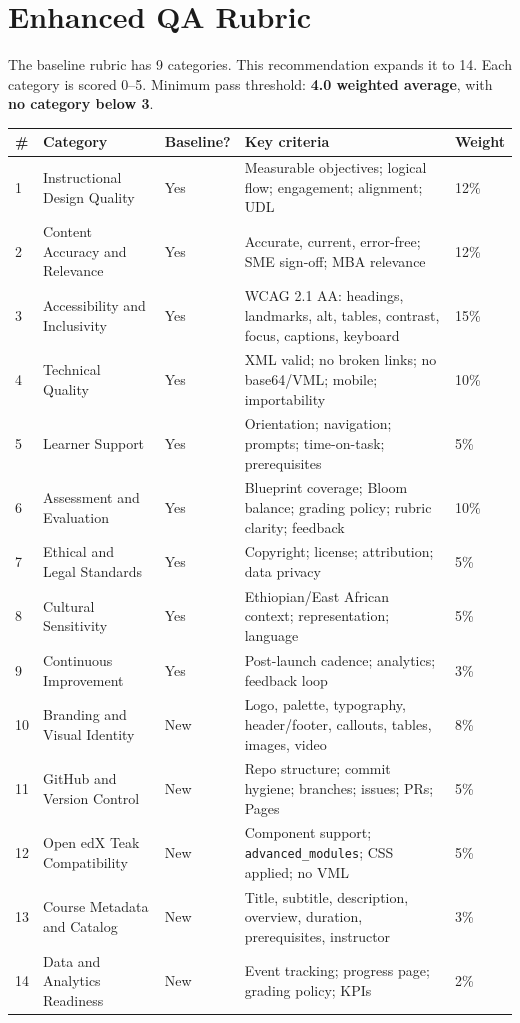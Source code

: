 \chapter{Enhanced QA Rubric}

The baseline rubric has 9 categories. This recommendation expands it
to 14. Each category is scored 0--5. Minimum pass threshold:
\textbf{4.0 weighted average}, with \textbf{no category below 3}.

\begin{longtable}{@{}p{}p{}p{}p{}p{}@{}}
\toprule
\textbf{\#} & \textbf{Category} & \textbf{Baseline?} & \textbf{Key criteria} & \textbf{Weight} \\
\midrule
\endhead
1 & Instructional Design Quality & Yes & Measurable objectives; logical flow; engagement; alignment; UDL & 12\% \\
2 & Content Accuracy and Relevance & Yes & Accurate, current, error-free; SME sign-off; MBA relevance & 12\% \\
3 & Accessibility and Inclusivity & Yes & WCAG 2.1 AA: headings, landmarks, alt, tables, contrast, focus, captions, keyboard & 15\% \\
4 & Technical Quality & Yes & XML valid; no broken links; no base64/VML; mobile; importability & 10\% \\
5 & Learner Support & Yes & Orientation; navigation; prompts; time-on-task; prerequisites & 5\% \\
6 & Assessment and Evaluation & Yes & Blueprint coverage; Bloom balance; grading policy; rubric clarity; feedback & 10\% \\
7 & Ethical and Legal Standards & Yes & Copyright; license; attribution; data privacy & 5\% \\
8 & Cultural Sensitivity & Yes & Ethiopian/East African context; representation; language & 5\% \\
9 & Continuous Improvement & Yes & Post-launch cadence; analytics; feedback loop & 3\% \\
10 & Branding and Visual Identity & New & Logo, palette, typography, header/footer, callouts, tables, images, video & 8\% \\
11 & GitHub and Version Control & New & Repo structure; commit hygiene; branches; issues; PRs; Pages & 5\% \\
12 & Open edX Teak Compatibility & New & Component support; \texttt{advanced\_modules}; CSS applied; no VML & 5\% \\
13 & Course Metadata and Catalog & New & Title, subtitle, description, overview, duration, prerequisites, instructor & 3\% \\
14 & Data and Analytics Readiness & New & Event tracking; progress page; grading policy; KPIs & 2\% \\
\bottomrule
\end{longtable}

